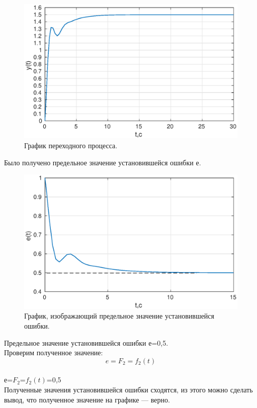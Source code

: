 \documentclass[a4paper,14pt]{article}
\begin{document}
\begin{figure}[H]
\centering
\includegraphics[width=\textwidth]{1/3_3y(t).eps}
\caption{График переходного процесса.}
\end{figure}

Было получено предельное значение установившейся ошибки е.
\begin{figure}[H]
\centering
\includegraphics[width=\textwidth]{1/3_3e(t).eps}
\caption{График, изображающий предельное значение установившейся ошибки.}
\end{figure}

Предельное значение установившейся ошибки е=0,5.
\\Проверим полученное значение:
\begin{equation}
e=F_{2}=f_{2}(t)
\end{equation}
\\е=$F_{2}$=$f_{2}(t)$=0,5
\\Полученные значения установившейся ошибки сходятся, из этого можно сделать вывод, что полученное значение на графике — верно.
\end{document}
